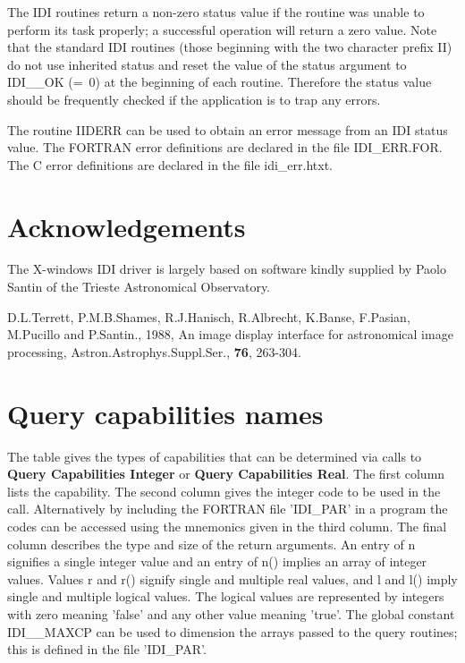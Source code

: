 \documentclass[11pt,nolof]{starlink}
\begin{document}
The IDI routines return a non-zero status value if the routine was
unable to perform its task properly; a successful operation will return
a zero value. Note that the standard IDI routines (those beginning with
the two character prefix II) do not use inherited status and reset the
value of the status argument to IDI\_\_OK (=~0) at the beginning of each
routine. Therefore the status value should be frequently checked if the
application is to trap any errors.

The routine IIDERR can be used to obtain an error message from an
IDI status value. The FORTRAN error definitions are declared in the
file IDI\_ERR.FOR. The C error definitions are declared in
the file idi\_err.htxt.

\section{Acknowledgements}

The X-windows IDI driver is largely based on software kindly supplied
by Paolo Santin of the Trieste Astronomical Observatory.

\begin{thebibliography}{}

D.L.Terrett, P.M.B.Shames, R.J.Hanisch, R.Albrecht,
K.Banse, F.Pasian, M.Pucillo and P.Santin., 1988,
An image display interface for astronomical image processing,
Astron.Astrophys.Suppl.Ser., \textbf{76}, 263-304.

\end{thebibliography}

\newpage
\appendix
\section{Query capabilities names}
\label{se:qcn}

The table gives the types of capabilities that can be determined via calls
to \textbf{Query Capabilities Integer} or \textbf{Query Capabilities Real}.
The first column lists the capability. The second column gives the
integer code to be used in the call. Alternatively by including the
FORTRAN file 'IDI\_PAR' in a program the codes can be accessed using
the mnemonics given in the third column. The final column describes
the type and size of the return arguments. An entry of n
signifies a single integer value and an entry of n() implies an
array of integer values. Values r and r() signify single and multiple
real values, and l and l() imply single and multiple logical values.
The logical values are represented by integers with zero meaning 'false'
and any other value meaning 'true'.
The global constant IDI\_\_MAXCP can be used to dimension the arrays passed
to the query routines; this is defined in the file 'IDI\_PAR'.
\end{document}

